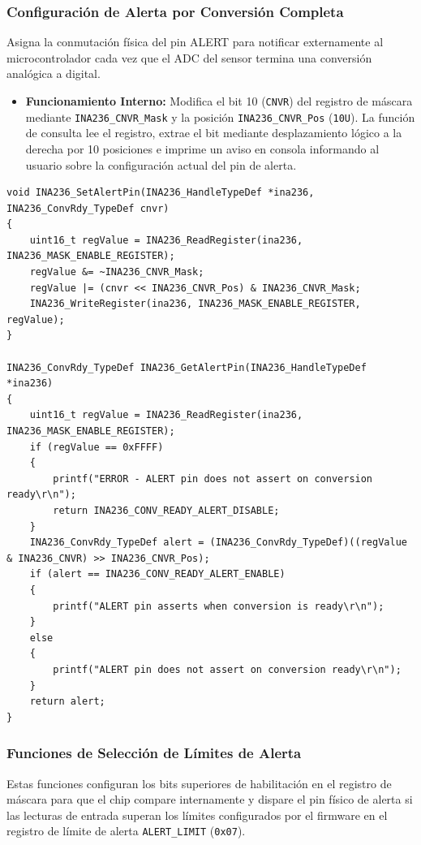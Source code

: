 \documentclass[
10pt, %
a4paper, %
oneside, %
headinclude,footinclude, %
BCOR5mm, %
]{scrartcl}
\begin{document}
\subsubsection{Configuración de Alerta por Conversión Completa}
Asigna la conmutación física del pin ALERT para notificar externamente al microcontrolador cada vez que el ADC del sensor termina una conversión analógica a digital.

\begin{itemize}
	\item \textbf{Funcionamiento Interno:}
		Modifica el bit 10 (\texttt{CNVR}) del registro de máscara mediante \texttt{INA236\_CNVR\_Mask} y la posición \texttt{INA236\_CNVR\_Pos} (\texttt{10U}). La función de consulta lee el registro, extrae el bit mediante desplazamiento lógico a la derecha por 10 posiciones e imprime un aviso en consola informando al usuario sobre la configuración actual del pin de alerta.
\end{itemize}

\begin{lstlisting}[style=CMakeStyle]
void INA236_SetAlertPin(INA236_HandleTypeDef *ina236, INA236_ConvRdy_TypeDef cnvr)
{
    uint16_t regValue = INA236_ReadRegister(ina236, INA236_MASK_ENABLE_REGISTER);
    regValue &= ~INA236_CNVR_Mask;
    regValue |= (cnvr << INA236_CNVR_Pos) & INA236_CNVR_Mask;
    INA236_WriteRegister(ina236, INA236_MASK_ENABLE_REGISTER, regValue);
}

INA236_ConvRdy_TypeDef INA236_GetAlertPin(INA236_HandleTypeDef *ina236)
{
    uint16_t regValue = INA236_ReadRegister(ina236, INA236_MASK_ENABLE_REGISTER);
    if (regValue == 0xFFFF)
    {
        printf("ERROR - ALERT pin does not assert on conversion ready\r\n");
        return INA236_CONV_READY_ALERT_DISABLE;
    }
    INA236_ConvRdy_TypeDef alert = (INA236_ConvRdy_TypeDef)((regValue & INA236_CNVR) >> INA236_CNVR_Pos);
    if (alert == INA236_CONV_READY_ALERT_ENABLE)
    {
        printf("ALERT pin asserts when conversion is ready\r\n");
    }
    else
    {
        printf("ALERT pin does not assert on conversion ready\r\n");
    }
    return alert;
}
\end{lstlisting}

\subsubsection{Funciones de Selección de Límites de Alerta}
Estas funciones configuran los bits superiores de habilitación en el registro de máscara para que el chip compare internamente y dispare el pin físico de alerta si las lecturas de entrada superan los límites configurados por el firmware en el registro de límite de alerta \texttt{ALERT\_LIMIT} (\texttt{0x07}).
\end{document}
